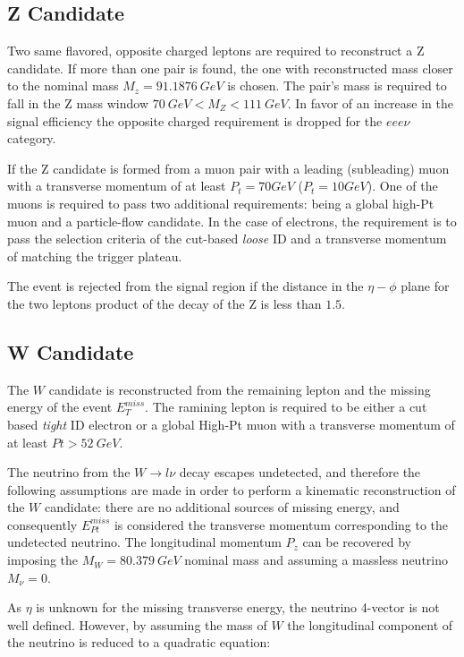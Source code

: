 \subsection{Z Candidate}

Two same flavored, opposite charged leptons are required to reconstruct a Z
candidate. If more than one pair is found, the one with reconstructed mass
closer to the nominal mass $M_z=91.1876~GeV$ is chosen. The pair's mass
is required to fall in the Z mass window $70~GeV < M_Z < 111~GeV$. In favor of an
increase in the signal efficiency the opposite charged requirement is dropped
for the $eee\nu$ category.

If the Z candidate is formed from a muon pair with a leading (subleading) muon with
a transverse momentum of at least $P_t=70 GeV$ ($P_t=10GeV$). One of the
muons is required to pass two additional requirements: being a global high-Pt muon and a
particle-flow candidate. In the case of electrons, the requirement is to pass the
selection criteria of the cut-based \emph{loose} ID and a transverse momentum of
matching the trigger plateau.

The event is rejected from the signal region if the distance in the $\eta-\phi$
plane for the two leptons product of the decay of the Z is less than $1.5$.

\subsection{W Candidate}

The $W$ candidate is reconstructed from the remaining lepton and the missing energy
of the event $E_T^{miss}$. The ramining lepton is required to be either a cut based \emph{tight}
ID electron or a global High-Pt muon with a transverse momentum
of at least $Pt>52~GeV$.

The neutrino from the $W \rightarrow l\nu$ decay escapes undetected,
and therefore the following assumptions are made in order to perform a kinematic
reconstruction of the $W$ candidate: there are no additional sources of missing
energy, and consequently $E_{Pt}^{miss}$ is considered the transverse momentum
corresponding to the undetected neutrino. The longitudinal momentum $P_z$ can be
recovered by imposing the $M_W=80.379~GeV $ nominal mass and assuming
a massless neutrino $M_\nu = 0.$

As $\eta$ is unknown for the missing transverse energy, the neutrino 4-vector is
not well defined. However, by assuming the mass of $W$ the longitudinal component
of the neutrino is reduced to a quadratic equation:

